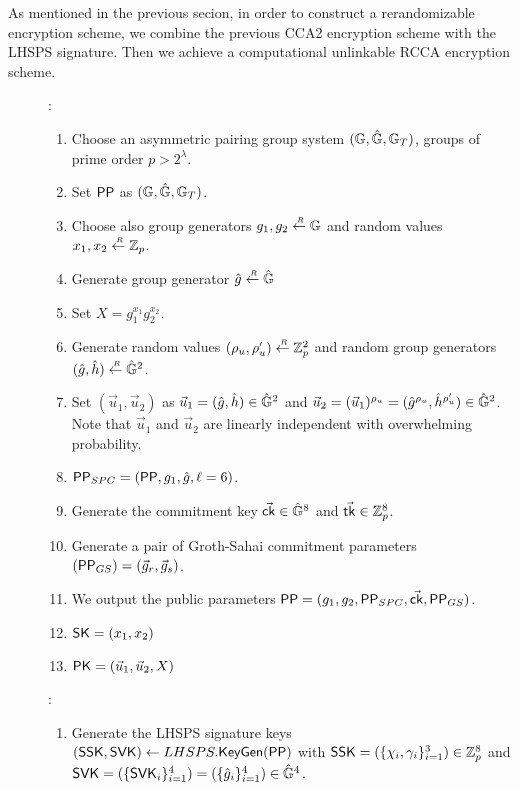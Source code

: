 As mentioned in the previous secion,
in order to construct a rerandomizable encryption scheme, we combine the previous CCA2 encryption scheme with the LHSPS signature. Then we achieve a computational unlinkable RCCA encryption scheme.

\begin{description}
\item[]:
  \begin{enumerate}
  \item Choose an asymmetric pairing group system $(\mathbb{G}, \hat{\mathbb{G}}, \mathbb{G}_T)$, groups of prime order $p > 2^\lambda$.
  \item Set $\mathsf{PP}$ as $(\mathbb{G}, \hat{\mathbb{G}}, \mathbb{G}_T)$.
  \item Choose also group generators $g_1, g_2 \stackrel{{\scriptscriptstyle \mkern4mu R}}{\gets} \mathbb{G}$ and random values $x_1, x_2 \stackrel{{\scriptscriptstyle \mkern4mu R}}{\gets} \mathbb{Z}_p$.
  \item Generate group generator $\hat{g} \stackrel{{\scriptscriptstyle \mkern4mu R}}{\gets} \hat{\mathbb{G}}$
  \item Set $X = g_1^{x_1}g_2^{x_2}$.
  \item Generate random values $(\rho_u, \rho_u') \stackrel{{\scriptscriptstyle \mkern4mu R}}{\gets} \mathbb{Z}_p^2$ and random group generators $(\hat{g}, \hat{h}) \stackrel{{\scriptscriptstyle \mkern4mu R}}{\gets} \hat{\mathbb{G}}^2$.
  \item Set $(\vec{u}_1, \vec{u}_2)$ as $\vec{u}_1 = (\hat{g}, \hat{h}) \in \hat{\mathbb{G}}^2$ and $\vec{u}_2 = (\vec{u}_1)^{\rho_u} = (\hat{g}^{\rho_u}, \hat{h}^{\rho_u'}) \in \hat{\mathbb{G}}^2$. Note that $\vec{u}_1$ and $\vec{u}_2$ are linearly independent with overwhelming probability.
  \item $\mathsf{PP}_{SPC} = (\mathsf{PP}, g_1, \hat{g}, \ell = 6)$.
  \item Generate the commitment key $\vec{\mathsf{ck}} \in \hat{\mathbb{G}}^8$ and $\vec{\mathsf{tk}} \in \mathbb{Z}_p^8$.
  \item Generate a pair of Groth-Sahai commitment parameters$(\mathsf{PP}_{GS}) = (\vec{g}_r, \vec{g}_s)$.
  \item We output the public parameters $\mathsf{PP} =  (g_1, g_2, \mathsf{PP}_{SPC}, \vec{\mathsf{ck}}, \mathsf{PP}_{GS})$.
  \item $\mathsf{SK} = (x_1, x_2)$
  \item $\mathsf{PK} = (\vec{u}_1, \vec{u}_2, X)$
  \end{enumerate}
\item[]:
  \begin{enumerate}
  \item Generate the LHSPS signature keys $(\mathsf{SSK}, \mathsf{SVK}) \gets LHSPS.{\mathsf{KeyGen}}(\mathsf{PP})$ with $\mathsf{SSK} = (\{\chi_i, \gamma_i\}_{i=1}^3) \in \mathbb{Z}_p^{8}$ and $\mathsf{SVK} = (\{\mathsf{SVK}_i\}_{i=1}^4) = (\{\hat{g}_i\}_{i =1}^4) \in \hat{\mathbb{G}}^4$.

\end{enumerate}
\end{description}
